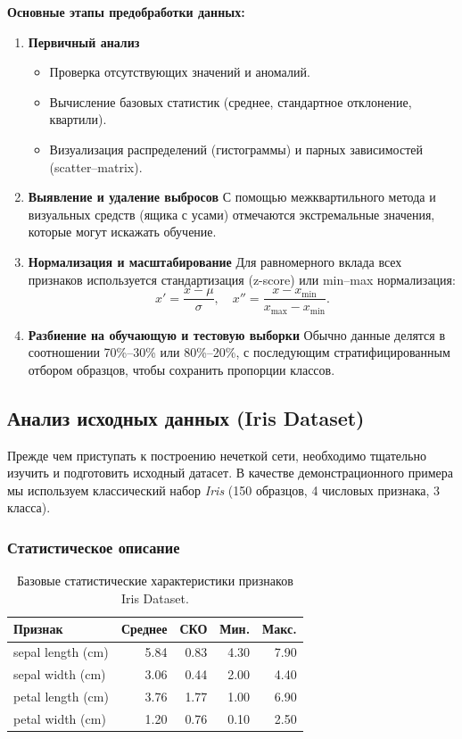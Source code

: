 \medskip
\noindent\textbf{Основные этапы предобработки данных:}
\begin{enumerate}
  \item \textbf{Первичный анализ}  
    \begin{itemize}
      \item Проверка отсутствующих значений и аномалий.
      \item Вычисление базовых статистик (среднее, стандартное отклонение, квартили).
      \item Визуализация распределений (гистограммы) и парных зависимостей (scatter–matrix).
    \end{itemize}
  \item \textbf{Выявление и удаление выбросов}  
    С помощью межквартильного метода и визуальных средств (ящика с усами) отмечаются экстремальные значения, которые могут искажать обучение.
  \item \textbf{Нормализация и масштабирование}  
    Для равномерного вклада всех признаков используется стандартизация (z-score) или min–max нормализация:
    \[
      x' = \frac{x - \mu}{\sigma},\quad
      x'' = \frac{x - x_{\min}}{x_{\max}-x_{\min}}.
    \]
  \item \textbf{Разбиение на обучающую и тестовую выборки}  
    Обычно данные делятся в соотношении 70\%–30\% или 80\%–20\%, с последующим стратифицированным отбором образцов, чтобы сохранить пропорции классов.
\end{enumerate}

\subsection{Анализ исходных данных (Iris Dataset)}


Прежде чем приступать к построению нечеткой сети, необходимо тщательно изучить и подготовить исходный датасет. В качестве демонстрационного примера мы используем классический набор \emph{Iris} (150 образцов, 4 числовых признака, 3 класса).

\subsubsection{Статистическое описание}
\begin{table}[H]
  \centering
  \caption{Базовые статистические характеристики признаков Iris Dataset.}
  \begin{tabular}{lrrrr}
    \toprule
    Признак & Среднее & СКО & Мин. & Макс. \\
    \midrule
    sepal length (cm) & 5.84 & 0.83 & 4.30 & 7.90 \\
    sepal width  (cm) & 3.06 & 0.44 & 2.00 & 4.40 \\
    petal length (cm) & 3.76 & 1.77 & 1.00 & 6.90 \\
    petal width  (cm) & 1.20 & 0.76 & 0.10 & 2.50 \\
    \bottomrule
  \end{tabular}
  \label{tab:iris_stats}
\end{table}


